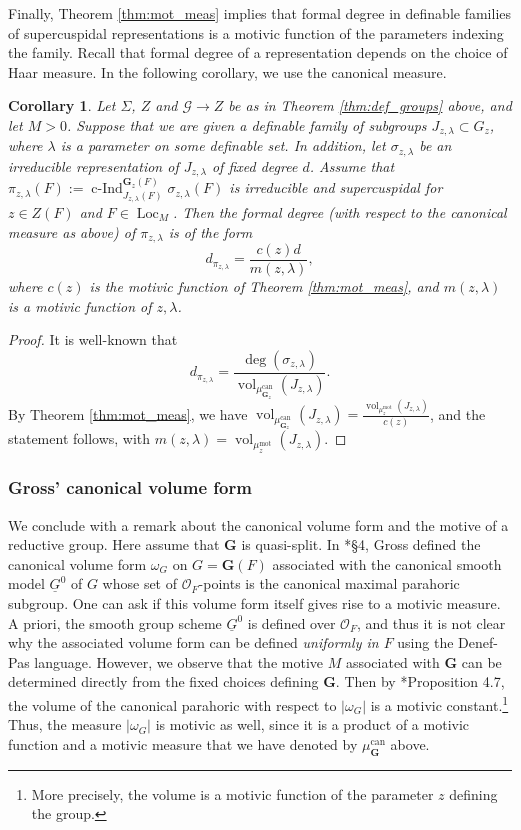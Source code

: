 \documentclass{amsart}
\newcommand{\ri}{\mathcal{O}}
\newcommand{\vol}{\operatorname{vol}}
\newcommand{\loc}{\operatorname{Loc}}
\newcommand{\ind}{\operatorname{c-Ind}}
\newcommand{\bG}{\mathbf{G}}
\newcommand{\can}{\mathrm{can}}
\newcommand{\cG}{\mathcal{G}}
\newcommand\mot{\mathrm{mot}}
\theoremstyle{plain}
\newtheorem{cor}[thm]{Corollary}
\theoremstyle{definition}
\begin{document}
Finally, Theorem \ref{thm:mot_meas} implies that formal degree in definable families of
supercuspidal representations is a motivic function of the parameters indexing the family. 
Recall that formal degree of a representation depends on the choice of Haar measure. 
In the following corollary, we use the canonical measure. 
 
\begin{cor} Let $\Sigma$, $Z$  and $\cG \to Z$ be as in Theorem \ref{thm:def_groups} above, and let $M > 0$.
Suppose that we are given a definable family of  subgroups $J_{z, \lambda} \subset G_z$,
where $\lambda$ is a parameter on some definable set. 
In addition, let $\sigma_{z, \lambda}$ be an irreducible representation of $J_{z, \lambda}$ of fixed degree $d$. 
Assume that $\pi_{z,\lambda}(F) := \ind_{J_{z,\lambda}(F)}^{\bG_z(F)} \sigma_{z,\lambda}(F)$
is irreducible and supercuspidal for $z \in Z(F)$ and $F \in \loc_M$.
Then the formal degree (with respect to the canonical measure as above) of $\pi_{z, \lambda}$ is of the form 
\[
d_{\pi_{z, \lambda}}=\frac{c(z)d}{m(z, \lambda)},
\]
where $c(z)$ is the motivic function of Theorem \ref{thm:mot_meas}, and $m(z, \lambda)$ is a motivic function of $z, \lambda$. 
\end{cor}
\begin{proof}
It is well-known  that
\[
d_{\pi_{z, \lambda}}=\frac{\deg(\sigma_{z, \lambda})}{\vol_{\mu_{\bG_z}^\can}(J_{z, \lambda})}.
\]
By Theorem \ref{thm:mot_meas}, we have 
$\vol_{\mu_{\bG_z}^\can}(J_{z, \lambda}) = \frac{\vol_{\mu_z^\mot}(J_{z, \lambda})}{c(z)}$,
and the statement follows, with $m(z, \lambda)=\vol_{\mu_z^\mot}(J_{z, \lambda})$.
\end{proof}

\subsubsection{Gross' canonical volume form}
We conclude with a remark about the canonical volume form and the motive of a reductive group. 
Here assume that $\bG$ is quasi-split. In  \cite{gross:motive}*{\S 4}, Gross defined the canonical volume form
$\omega_G$ on $G=\bG(F)$ associated with the canonical smooth model 
$\underline{G}^0$ of $G$ whose set of $\ri_F$-points is the canonical maximal parahoric subgroup. 
One can ask if this volume form itself gives rise to a motivic measure. 
A priori, the smooth group scheme $\underline{G}^0$ is defined over $\ri_F$, and thus it is not clear why the
associated volume form can be defined \emph{uniformly in $F$} using the Denef-Pas language.
However, we observe that the motive $M$ associated with $\bG$ can be determined directly from the fixed choices defining $\bG$. 
Then by \cite{gross:motive}*{Proposition 4.7}, the volume of the canonical parahoric with respect to $|\omega_G|$
is a motivic constant.\footnote{More precisely, the volume is a motivic function of the parameter $z$ defining the group.}  
Thus, the measure $|\omega_G|$ is motivic as well, since it is a product of a motivic function
and a motivic measure that we have denoted by $\mu_{\bG}^\can$ above. 
\end{document}
